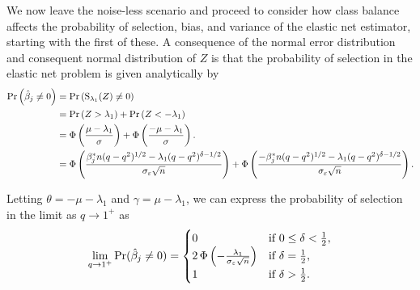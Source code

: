 We now leave the noise-less scenario and proceed to consider how class balance affects the probability of selection, bias, and variance of the elastic net estimator, starting with the first of these. A consequence of the normal error distribution and consequent normal distribution of \(Z\) is that the probability of selection in the elastic net problem is given analytically by
\begin{align*}
  \Pr\left(\hat{\beta}_j \neq 0\right) & = \Pr\left(\operatorname{S}_{\lambda_1}(Z) \neq 0\right)                                                                                                                                                                                                               \\
                                       & = \Pr\left(Z > \lambda_1\right) + \Pr\left(Z < -\lambda_1\right)                                                                                                                                                                                          \\
                                       & = \operatorname{\Phi}\left(\frac{\mu - \lambda_1}{\sigma}\right) + \operatorname{\Phi}\left(\frac{- \mu -\lambda_1}{\sigma}\right).                                                                                                                                                     \\
                                       & = \operatorname{\Phi} \left( \frac{\beta_j^*n (q-q^2)^{1/2} - \lambda_1(q-q^2)^{\delta - 1/2}}{\sigma_\varepsilon \sqrt{n}}\right)                 + \operatorname{\Phi} \left( \frac{-\beta_j^*n (q-q^2)^{1/2} - \lambda_1(q-q^2)^{\delta - 1/2}}{\sigma_\varepsilon \sqrt{n}}\right).
\end{align*}

Letting \(\theta = -\mu - \lambda_1 \) and \(\gamma = \mu - \lambda_1\), we can express the probability of selection in the limit as \(q \rightarrow 1^+\) as
\[
  \lim_{q \rightarrow 1^+} \Pr(\hat{\beta}_j \neq 0) =
  \begin{cases}
    0                                                                & \text{if } 0 \leq \delta < \frac{1}{2}, \\
    2\operatorname{\Phi}\left(-\frac{\lambda_1}{\sigma_\varepsilon \sqrt{n}}\right) & \text{if } \delta = \frac{1}{2},        \\
    1                                                                & \text{if } \delta > \frac{1}{2}.
  \end{cases}
\]

